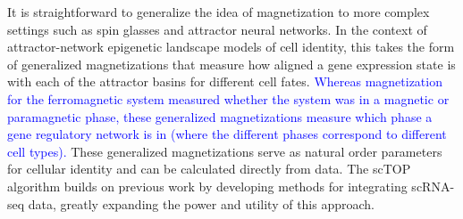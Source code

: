 \documentclass[12pt,american]{scrartcl}
\begin{document}
\begin{revresponse}
\begin{changes}
        It is straightforward to generalize the idea of magnetization to more complex settings such as spin glasses and attractor neural networks. In the context of attractor-network epigenetic landscape models of cell identity, this takes the form of generalized magnetizations that measure how aligned a gene expression state is with each of the attractor basins for different cell fates. \textcolor{blue}{Whereas magnetization for the ferromagnetic system measured whether the system was in a magnetic or paramagnetic phase, these generalized magnetizations measure which phase a gene regulatory network is in (where the different phases correspond to different cell types).} These generalized magnetizations serve as natural order parameters for cellular identity and can be calculated directly from data. The scTOP algorithm builds on previous work by developing methods for integrating scRNA-seq data, greatly expanding the power and utility of this approach. 
    \end{changes}
\end{revresponse}
\end{document}
